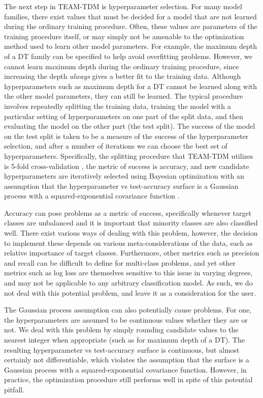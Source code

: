 \documentclass[conference]{IEEEtran}
\begin{document}
The next step in TEAM-TDM is hyperparameter selection.
 For many model families, there exist values that must be decided for a model that are not learned during the ordinary training procedure.
 Often, these values are parameters of the training procedure itself, or may simply not be amenable to the optimization method used to learn other model parameters.
 For example, the maximum depth of a DT family can be specified to help avoid overfitting problems.
 However, we cannot learn maximum depth during the ordinary training procedure, since increasing the depth \emph{always} gives a better fit to the training data.
 Although hyperparameters such as maximum depth for a DT cannot be learned along with the other model parameters, they can still be learned.
 The typical procedure involves repeatedly splitting the training data, training the model with a particular setting of hyperparameters on one part of the split data, and then evaluating the model on the other part (the test split).
 The success of the model on the test split is taken to be a measure of the success of the hyperparameter selection, and after a number of iterations we can choose the best set of hyperparameters.
 Specifically, the splitting procedure that TEAM-TDM utilizes is 5-fold cross-validation \cite{stone1974cross}, the metric of success is accuracy, and new candidate hyperparameters are iteratively selected using Bayesian optimization with an assumption that the hyperparameter vs test-accuracy surface is a Gaussian process with a squared-exponential covariance function \cite{snoek2012practical}.
 
Accuracy can pose problems as a metric of success, specifically whenever target classes are unbalanced and it is important that minority classes are also classified well.
 There exist various ways of dealing with this problem, however, the decision to implement these depends on various meta-considerations of the data, such as relative importance of target classes.
 Furthermore, other metrics such as precision and recall can be difficult to define for multi-class problems, and yet other metrics such as log loss are themselves sensitive to this issue in varying degrees, and may not be applicable to any arbitrary classification model.
 As such, we do not deal with this potential problem, and leave it as a consideration for the user.

The Gaussian process assumption can also potentially cause problems.
 For one, the hyperparameters are assumed to be continuous values whether they are or not.
 We deal with this problem by simply rounding candidate values to the nearest integer when appropriate (such as for maximum depth of a DT).
 The resulting hyperparameter vs test-accuracy surface is continuous, but almost certainly not differentiable, which violates the assumption that the surface is a Gaussian process with a squared-exponential covariance function.
 However, in practice, the optimization procedure still performs well in spite of this potential pitfall.
\end{document}
